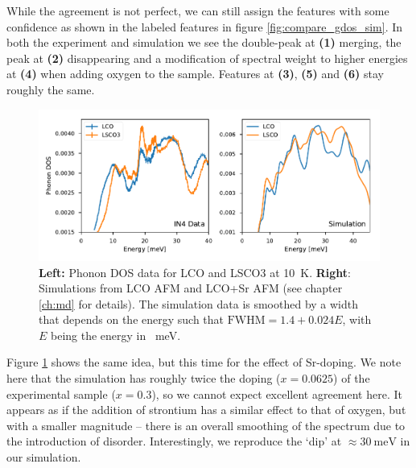 While the agreement is not perfect, we can still assign the features with some confidence as shown in the labeled features in figure \ref{fig:compare_gdos_sim}. In both the experiment and simulation we see the double-peak at \textbf{(1)} merging, the peak at \textbf{(2)} disappearing and a modification of spectral weight to higher energies at \textbf{(4)} when adding oxygen to the sample. Features at \textbf{(3)}, \textbf{(5)} and \textbf{(6)} stay roughly the same.

\begin{figure}
    \centering
    \includegraphics[width=\textwidth]{fig/gdos/lco_lsco_sim_compare.pdf}
    \caption{\textbf{Left:} Phonon DOS data for LCO and LSCO3 at \SI{10}{\kelvin}. \textbf{Right}: Simulations from LCO AFM and LCO+Sr AFM (see chapter \ref{ch:md} for details). The simulation data is smoothed by a width that depends on the energy such that $\text{FWHM} = 1.4 + 0.024E$, with $E$ being the energy in \SI{}{\milli\eV}.}
    \label{fig:compare_lco_lsco_sim}
\end{figure}

Figure \ref{fig:compare_lco_lsco_sim} shows the same idea, but this time for the effect of Sr-doping. We note here that the simulation has roughly twice the doping ($x=0.0625$) of the experimental sample ($x=0.3$), so we cannot expect excellent agreement here. It appears as if the addition of strontium has a similar effect to that of oxygen, but with a smaller magnitude -- there is an overall smoothing of the spectrum due to the introduction of disorder. Interestingly, we reproduce the `dip' at $\approx \SI{30}{\milli\eV}$ in our simulation.

